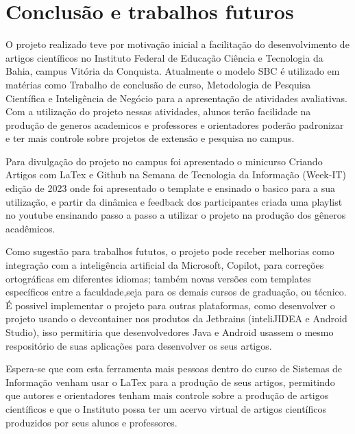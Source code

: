 \section{Conclusão e trabalhos futuros}

O projeto realizado teve por motivação inicial a facilitação do desenvolvimento de artigos científicos no Instituto Federal de Educação Ciência e Tecnologia da Bahia, campus Vitória da Conquista. Atualmente o modelo SBC é utilizado em matérias como Trabalho de conclusão de curso, Metodologia de Pesquisa Científica e Inteligência de Negócio para a apresentação de atividades avaliativas. Com a utilização do projeto nessas atividades, alunos terão facilidade na produção de generos academicos e professores e orientadores poderão padronizar e ter mais controle sobre projetos de extensão e pesquisa no campus.

Para divulgação do projeto no campus foi apresentado o minicurso Criando Artigos com LaTex e Github na Semana de Tecnologia da Informação (Week-IT) edição de 2023 onde foi apresentado o template e ensinado o basico para a sua utilização, e partir da dinâmica e feedback dos participantes criada uma playlist no youtube ensinando passo a passo a utilizar o projeto na produção dos gêneros acadêmicos.

Como sugestão para trabalhos fututos, o projeto pode receber melhorias como integração com a inteligência artificial da Microsoft, Copilot, para correções ortográficas em diferentes idiomas; também novas versões com templates específicos entre a faculdade,seja para os demais cursos de graduação, ou técnico. É possivel implementar o projeto para outras plataformas, como desenvolver o projeto usando o devcontainer nos produtos da Jetbrains (inteliJIDEA e Android Studio), isso permitiria que desenvolvedores Java e Android usassem o mesmo respositório de suas aplicações para desenvolver os seus artigos.

Espera-se que com esta ferramenta mais pessoas dentro do curso de Sistemas de Informação venham usar o LaTex para a produção de seus artigos, permitindo que autores e orientadores tenham mais controle sobre a produção de artigos científicos e que o Instituto possa ter um acervo virtual de artigos científicos produzidos por seus alunos e professores.